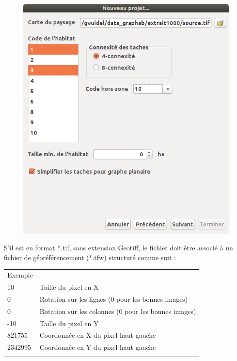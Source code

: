\documentclass{article}
\begin{document}
\begin{figure}[H]
	\includegraphics[scale=0.5]{img/manual-fr_img3.png} 
\end{figure}

S’il est en format *.tif, sans extension Geotiff, le fichier doit être associé à un fichier de géoréférencement (*.tfw) structuré comme suit :

\begin{table}[H]
\centering
\begin{tabular}{|m{3.552cm}|m{7.0800004cm}}
\hhline{-~}
Exemple & \\
\hhline{-~}
10 & Taille du pixel en X\\
0 & Rotation sur les lignes (0 pour les bonnes images)\\
0 & Rotation sur les colonnes (0 pour les bonnes images)\\
{}-10 & Taille du pixel en Y\\
821755 & Coordonnée en X du pixel haut gauche\\
2342995 & Coordonnée en Y du pixel haut gauche\\
\hhline{-~}
\end{tabular}
\end{table}
\end{document}
